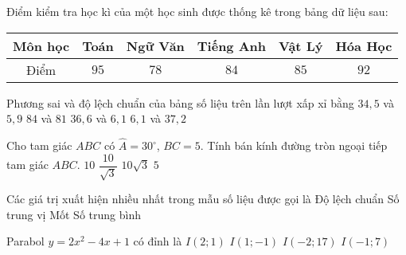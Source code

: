 \begin{ex}%
	Điểm kiểm tra học kì của một học sinh được thống kê trong bảng dữ liệu sau:
\begin{center}
	\begin{tabular}{|c|c|c|c|c|c|} \hline
		\textbf{Môn học} & \textbf{Toán} & \textbf{Ngữ Văn}& \textbf{Tiếng Anh} & \textbf{Vật Lý} & \textbf{Hóa Học}\\ \hline
		Điểm & $95$ & $ 78 $ & $ 84 $ & $ 85 $ & $ 92 $ \\ \hline
	\end{tabular}
\end{center}
	Phương sai và độ lệch chuẩn của bảng số liệu trên lần lượt xấp xỉ bằng
	\choice
	{$34{,}5$ và $5{,}9$}
	{$84$ và $81$}
	{\True $36{,}6$ và $6{,}1$}
	{$6{,}1$ và $37{,}2$}
\end{ex}
\begin{ex}%
	Cho tam giác $ABC$ có $\widehat{A}=30^{\circ}$, $BC=5$. Tính bán kính đường tròn ngoại tiếp tam giác $ABC$.
	\choice
	{$10$}
	{$\dfrac{10}{\sqrt{3}}$}
	{$10\sqrt{3}$}
	{\True $5$}
\end{ex}
\begin{ex}%
	Các giá trị xuất hiện nhiều nhất trong mẫu số liệu được gọi là
	\choice
	{Độ lệch chuẩn}
	{Số trung vị}
	{\True Mốt}
	{Số trung bình}
\end{ex}
\begin{ex}%
	Parabol $y=2x^2-4x+1$ có đỉnh là
	\choice
	{$I(2;1)$}
	{\True $I(1;-1)$}
	{$I(-2;17)$}
	{$I(-1;7)$}
\end{ex}
